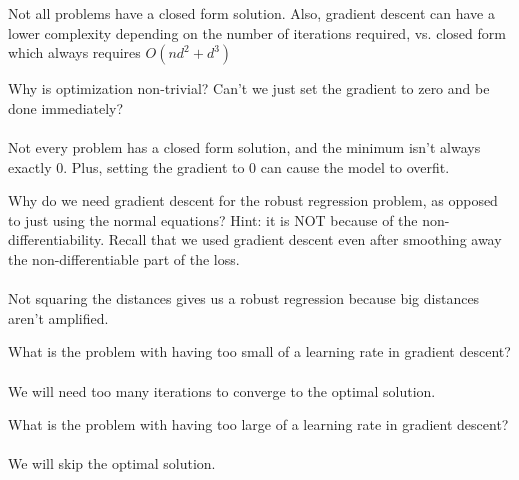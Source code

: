\documentclass{article}
\begin{document}
{Not all problems have a closed form solution. Also, gradient descent can have a lower complexity depending on the number of iterations required, vs. closed form which always requires $O(nd^2 + d^3)$
\item Why is optimization non-trivial? Can't we just set the gradient to zero and be done immediately?\\\\
Not every problem has a closed form solution, and the minimum isn't always exactly 0. Plus, setting the gradient to 0 can cause the model to overfit.
\item Why do we need gradient descent for the robust regression problem, as opposed to just using the normal equations? Hint: it is NOT because of the non-differentiability. Recall that we used gradient descent even after smoothing away the non-differentiable part of the loss.\\\\
Not squaring the distances gives us a robust regression because big distances aren't amplified.
\item What is the problem with having too small of a learning rate in gradient descent?\\\\
We will need too many iterations to converge to the optimal solution.
\item What is the problem with having too large of a learning rate in gradient descent?\\\\
We will skip the optimal solution.
}
\end{document}
